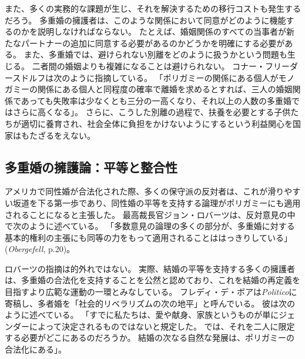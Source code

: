 \documentclass[paper=a4,book,openany]{jlreq}
\newcommand{\ig}[1]{}           %
\begin{document}
また、多くの実務的な課題が生じ、それを解決するための移行コストも発生するだろう。
多重婚の擁護者は、このような関係において同意がどのように機能するのかを説明しなければならない。
たとえば、婚姻関係のすべての当事者が新たなパートナーの追加に同意する必要があるのかどうかを明確にする必要がある。
また、多重婚では、避けられない別離をどのように扱うかという問題も生じる。
二者間の婚姻よりも複雑になることは避けられない。
コナー・フリーダースドルフは次のように指摘している。
「ポリガミーの関係にある個人がモノガミーの関係にある個人と同程度の確率で離婚を求めるとすれば、三人の婚姻関係であっても失敗率は少なくとも三分の一高くなり、それ以上の人数の多重婚ではさらに高くなる」\citep{friedersdorf15:_case_encour_polyg}。
さらに、こうした別離の過程で、扶養を必要とする子供たちが適切に養育され、社会全体に負担をかけないようにするという利益関心を国家はもたざるをえない。

\subsection{多重婚の擁護論：平等と整合性}

アメリカで同性婚が合法化された際、多くの保守派の反対者は、これが滑りやすい坂道を下る第一歩であり、同性婚の平等を支持する論理がポリガミーにも適用されることになると主張した。
最高裁長官ジョン・ロバーツ\ig{John Roberts}は、反対意見の中で次のように述べている。
「多数意見の論理の多くの部分が、多重婚に対する基本的権利の主張にも同等の力をもって適用されることははっきりしている」(\emph{Obergefell}, p.20)。

ロバーツ\ig{John Roberts}の指摘は的外れではない。
実際、結婚の平等を支持する多くの擁護者は、多重婚の合法化を支持することを公然と認めており、これを結婚の再定義を目指すより広範な運動の一環とみなしている。
フレディ・デ・ボアは\emph{Politico}に寄稿し、多者婚を「社会的リベラリズムの次の地平」と呼んでいる。
彼は次のように述べている。
「すでに私たちは、愛や献身、家族というものが単にジェンダーによって決定されるものではないと規定した。
では、それを二人に限定する必要がどこにあるのだろうか。
結婚の次なる自然な発展は、ポリガミーの合法化にある」\citep{deboer15:_it_time_legal_polyg}。
\end{document}
